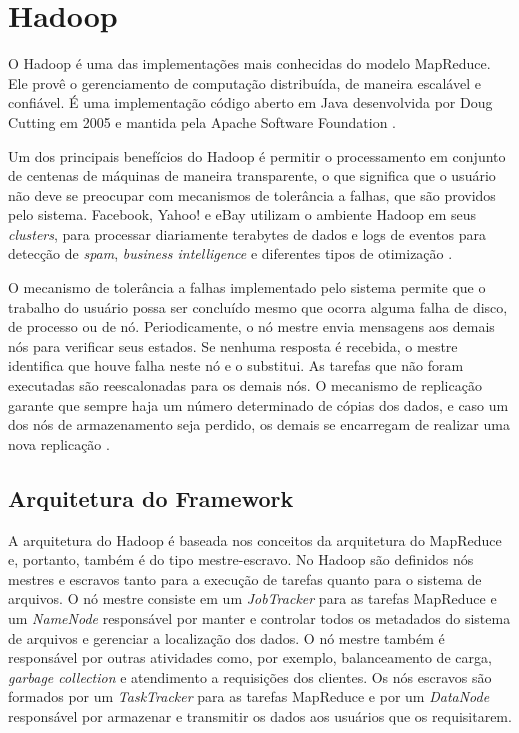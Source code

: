 \section{Hadoop}

O Hadoop é uma das  implementações mais conhecidas do modelo MapReduce. Ele provê o gerenciamento de computação distribuída, de maneira escalável e confiável. É uma implementação código aberto em Java  desenvolvida por Doug Cutting em 2005 e mantida pela Apache Software Foundation \cite{White:2009, Hadoop:2010}.

Um dos principais benefícios do Hadoop é permitir o processamento em conjunto de centenas de máquinas de maneira transparente, o que significa que o usuário não deve se preocupar com mecanismos de tolerância a falhas, que são providos pelo sistema. %
Facebook, Yahoo! e eBay utilizam o ambiente Hadoop em seus \textit{clusters}, para processar diariamente terabytes de dados e logs de eventos para detecção de \textit{spam}, \textit{business intelligence} e diferentes tipos de otimização \cite{Cherkasova:2011}.

O mecanismo de tolerância a falhas implementado pelo sistema permite que o trabalho do usuário possa ser concluído mesmo que ocorra alguma falha de disco, de processo ou de nó. Periodicamente, o nó mestre envia mensagens aos demais nós para verificar seus estados. Se nenhuma resposta é recebida, o mestre identifica que houve falha neste nó e o substitui. 
As tarefas que não foram executadas são reescalonadas para os demais nós. O mecanismo de replicação garante que sempre haja um número determinado de cópias dos dados, e caso um dos nós de armazenamento seja perdido, os demais se encarregam de realizar uma nova replicação \cite{White:2009}.

\subsection{Arquitetura do Framework}

A arquitetura do Hadoop é baseada nos conceitos da arquitetura do MapReduce e, portanto, também é do tipo mestre-escravo. No Hadoop são definidos nós mestres e escravos tanto para a execução de tarefas quanto para o sistema de arquivos.
O nó mestre consiste em um \textit{JobTracker}  para as tarefas MapReduce e um \textit{NameNode}  responsável por manter e controlar todos os metadados do sistema de arquivos e gerenciar a localização dos dados. O nó mestre também é responsável por outras atividades como, por exemplo, balanceamento de carga, \textit{garbage collection} e atendimento a requisições dos clientes.
Os nós escravos são formados por um \textit{TaskTracker}  para as tarefas MapReduce e por um \textit{DataNode} responsável por armazenar e transmitir os dados aos usuários que os requisitarem.

